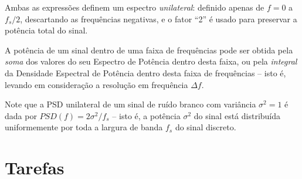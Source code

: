 \documentclass[a4paper,twoside,12pt]{article}
\begin{document}
	Ambas as expressões definem um espectro \emph{unilateral}: definido apenas de $f=0$ a $f_s/2$, descartando as frequências negativas, e o fator ``2'' é usado para preservar a potência total do sinal.
	
	A potência de um sinal dentro de uma faixa de frequências pode ser obtida pela \emph{soma} dos valores do seu Espectro de Potência dentro desta faixa, ou pela \emph{integral} da Densidade Espectral de Potência dentro desta faixa de frequências -- isto é, levando em consideração a resolução em frequência $\Delta f$.
	
	Note que a PSD unilateral de um sinal de ruído branco com variância $\sigma^2 = 1$ é dada por $PSD(f) = 2 \sigma^2/f_s$ -- isto é, a potência $\sigma^2$ do sinal está distribuída uniformemente por toda a largura de banda $f_s$ do sinal discreto.
	
	\section{Tarefas}
	
\end{document}
